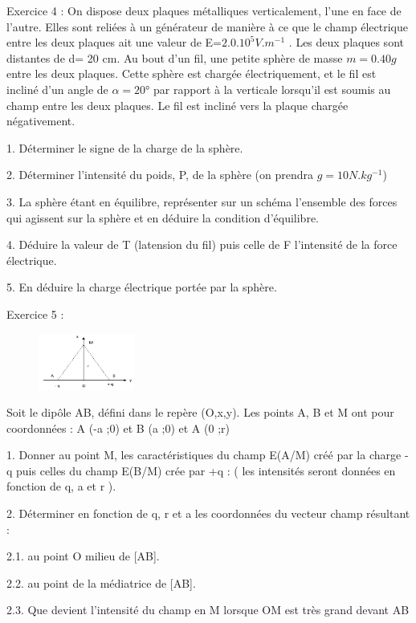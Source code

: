 \documentclass[12pt, french]{article}
\begin{document}
\begin{Box2}{Exercice 4 : }
On dispose deux plaques métalliques verticalement, l’une en face de l’autre. Elles sont reliées à un générateur de
   manière à ce que le champ électrique entre les deux plaques ait une valeur de E=$2.0 .10^5 V.m^{-1} $ . Les deux plaques sont distantes de d= 20 cm.
Au bout d’un fil, une petite sphère de masse $m = 0.40 g$  entre les deux plaques. Cette sphère est chargée
électriquement, et le fil est incliné d’un angle de $\alpha= 20$° par rapport à la verticale lorsqu’il est soumis au champ
entre les deux plaques. Le fil est incliné vers la plaque chargée négativement.

1. Déterminer le signe de la charge de la sphère.
   
2. Déterminer l’intensité du poids, P, de la sphère (on prendra $g=10 N.kg^{-1}$)

3. La sphère étant en équilibre, représenter sur un schéma l’ensemble des forces qui agissent sur la sphère et en déduire la condition d’équilibre.

4. Déduire la valeur de T (latension du fil) puis celle de F l’intensité de la force électrique.

5. En déduire la charge électrique portée par la sphère.
\end{Box2}
\begin{Box2}{Exercice 5 : }
   \begin{figure}
     \vspace{-0.75cm}
    \includegraphics[width=0.28\textwidth]{./img/img_01.png}
\end{figure}
Soit le dipôle AB, défini dans le repère (O,x,y). Les points A, B et M
ont pour coordonnées : A (-a ;0) et B (a ;0) et A (0 ;r)

1. Donner au point M, les caractéristiques du champ E(A/M) créé par
la charge -q puis celles du champ E(B/M) crée par +q : ( les intensités
seront données en fonction de q, a et r ).

2. Déterminer en fonction de q, r et a les coordonnées du vecteur
champ résultant :

2.1. au point O milieu de [AB].

   2.2. au point de la médiatrice de [AB].

   2.3. Que devient l’intensité du champ en M lorsque OM est très grand devant AB
\end{Box2}
\end{document}
